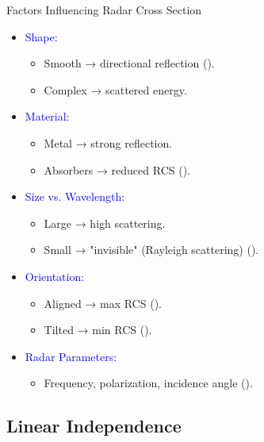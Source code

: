 \begin{frame}{Factors Influencing Radar Cross Section}
    \small
    \begin{itemize}
        \item \textcolor{blue}{Shape:}
            \begin{itemize}
                \item Smooth → directional reflection (\cite[p. 47]{knott2004radar}).
                \item Complex → scattered energy.
            \end{itemize}
        \item \textcolor{blue}{Material:}
            \begin{itemize}
                \item Metal → strong reflection.
                \item Absorbers → reduced RCS (\cite[Section 3.2]{knott2004radar}).
            \end{itemize}
        \item \textcolor{blue}{Size vs. Wavelength:}
            \begin{itemize}
                \item Large → high scattering.
                \item Small → "invisible" (Rayleigh scattering) (\cite[p. 188]{kolosov1987}).
            \end{itemize}
        \item \textcolor{blue}{Orientation:}
            \begin{itemize}
                \item Aligned → max RCS (\cite[Eq. 2.1]{knott2004radar}).
                \item Tilted → min RCS (\cite[p. 22]{skolnik1962introduction}).
            \end{itemize}
        \item \textcolor{blue}{Radar Parameters:}
            \begin{itemize}
                \item Frequency, polarization, incidence angle (\cite[p. 45]{cite-trcs}).
            \end{itemize}
    \end{itemize}
\end{frame}


\subsection{Linear Independence}
	
